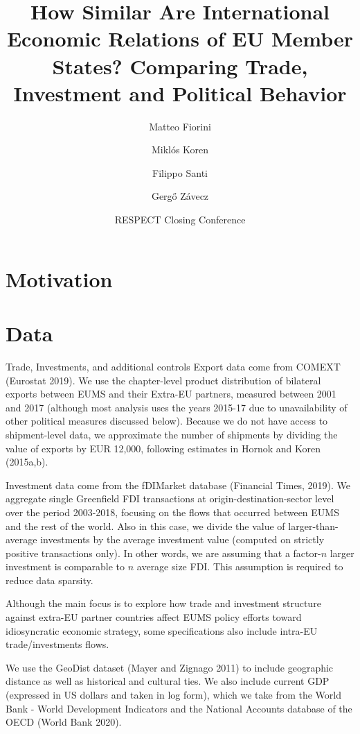 \documentclass[
  ignorenonframetext,
  aspectratio=16,
]{beamer}
\title{How Similar Are International Economic Relations of EU Member
States? Comparing Trade, Investment and Political Behavior}
\author{Matteo Fiorini \and Miklós Koren \and Filippo Santi \and Gergő
Závecz}
\date{RESPECT Closing Conference}
\begin{document}
\frame{\titlepage}

\hypertarget{motivation}{%
\section{Motivation}\label{motivation}}

\hypertarget{data}{%
\section{Data}\label{data}}

\begin{frame}{Trade, Investments, and additional controls}
\protect\hypertarget{trade-investments-and-additional-controls}{}
Export data come from COMEXT (Eurostat 2019). We use the chapter-level
product distribution of bilateral exports between EUMS and their
Extra-EU partners, measured between 2001 and 2017 (although most
analysis uses the years 2015-17 due to unavailability of other political
measures discussed below). Because we do not have access to
shipment-level data, we approximate the number of shipments by dividing
the value of exports by EUR 12,000, following estimates in Hornok and
Koren (2015a,b).

Investment data come from the fDIMarket database (Financial Times,
2019). We aggregate single Greenfield FDI transactions at
origin-destination-sector level over the period 2003-2018, focusing on
the flows that occurred between EUMS and the rest of the world. Also in
this case, we divide the value of larger-than-average investments by the
average investment value (computed on strictly positive transactions
only). In other words, we are assuming that a factor-\(n\) larger
investment is comparable to \(n\) average size FDI. This assumption is
required to reduce data sparsity.

Although the main focus is to explore how trade and investment structure
against extra-EU partner countries affect EUMS policy efforts toward
idiosyncratic economic strategy, some specifications also include
intra-EU trade/investments flows.

We use the GeoDist dataset (Mayer and Zignago 2011) to include
geographic distance as well as historical and cultural ties. We also
include current GDP (expressed in US dollars and taken in log form),
which we take from the World Bank - World Development Indicators and the
National Accounts database of the OECD (World Bank 2020).
\end{frame}
\end{document}
